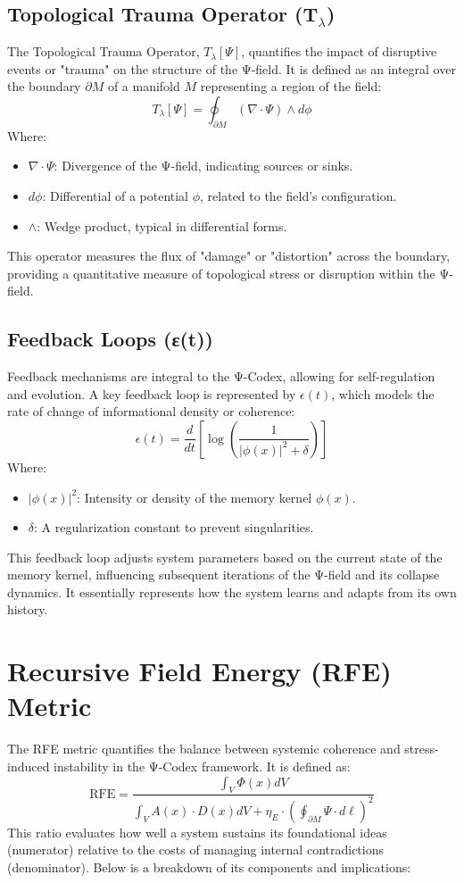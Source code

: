 \documentclass[11pt]{article}
\begin{document}
\subsection{Topological Trauma Operator (T\(_\lambda\))}
The Topological Trauma Operator, \( T_\lambda[\Psi] \), quantifies the impact of disruptive events or "trauma" on the structure of the Ψ-field. It is defined as an integral over the boundary \( \partial M \) of a manifold \( M \) representing a region of the field:
\[
T_\lambda[\Psi] = \oint_{\partial M} (\nabla \cdot \Psi) \land d\phi
\]
Where:
\begin{itemize}
    \item \( \nabla \cdot \Psi \): Divergence of the Ψ-field, indicating sources or sinks.
    \item \( d\phi \): Differential of a potential \( \phi \), related to the field's configuration.
    \item \( \land \): Wedge product, typical in differential forms.
\end{itemize}
This operator measures the flux of "damage" or "distortion" across the boundary, providing a quantitative measure of topological stress or disruption within the Ψ-field.

\subsection{Feedback Loops (ε(t))}
Feedback mechanisms are integral to the Ψ-Codex, allowing for self-regulation and evolution. A key feedback loop is represented by \( \epsilon(t) \), which models the rate of change of informational density or coherence:
\[
\epsilon(t) = \frac{d}{dt} \left[ \log\left(\frac{1}{|\phi(x)|^2 + \delta}\right) \right]
\]
Where:
\begin{itemize}
    \item \( |\phi(x)|^2 \): Intensity or density of the memory kernel \( \phi(x) \).
    \item \( \delta \): A regularization constant to prevent singularities.
\end{itemize}
This feedback loop adjusts system parameters based on the current state of the memory kernel, influencing subsequent iterations of the Ψ-field and its collapse dynamics. It essentially represents how the system learns and adapts from its own history.

\section{Recursive Field Energy (RFE) Metric}
The RFE metric quantifies the balance between systemic coherence and stress-induced instability in the Ψ-Codex framework. It is defined as:
\[ \text{RFE} = \frac{\int_V \Phi(x)dV}{\int_V A(x)\cdot D(x)dV + \eta_E \cdot \left(\oint_{\partial M} \Psi \cdot d\ell\right)^2} \]
This ratio evaluates how well a system sustains its foundational ideas (numerator) relative to the costs of managing internal contradictions (denominator). Below is a breakdown of its components and implications:
\end{document}
